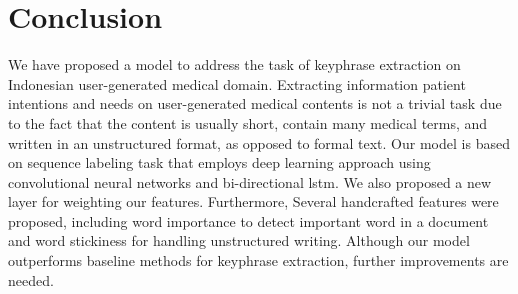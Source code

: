 \documentclass[sigconf]{acmart}
\begin{document}
\section{Conclusion}
We have proposed a model to address the task of keyphrase extraction on Indonesian user-generated medical domain. Extracting information patient intentions and needs on user-generated medical contents is not a trivial task due to the fact that the content is usually short, contain many medical terms, and written in an unstructured format, as opposed to formal text. Our model is based on sequence labeling task that employs deep learning approach using convolutional neural networks and bi-directional lstm. We also proposed a new layer for weighting our features. Furthermore, Several handcrafted features were proposed, including word importance to detect important word in a document and word stickiness for handling unstructured writing. Although our model outperforms baseline methods for keyphrase extraction, further improvements are needed.


 
\end{document}

